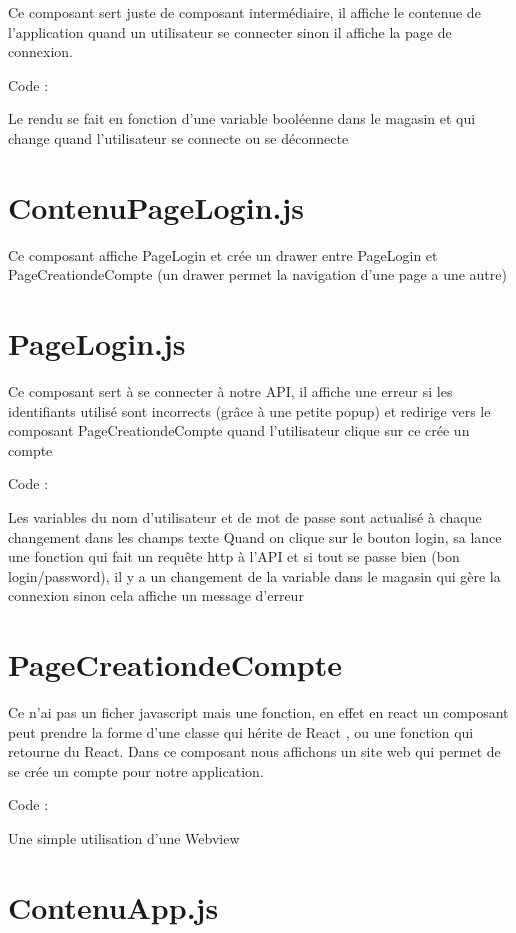 Ce composant sert juste de composant intermédiaire, il affiche le contenue de l’application quand un utilisateur se connecter sinon il affiche la page de connexion.

Code :

Le rendu se fait en fonction d’une variable booléenne dans le magasin et qui change quand l’utilisateur se connecte ou se déconnecte


\section{ContenuPageLogin.js}

Ce composant affiche PageLogin et crée un drawer entre PageLogin et PageCreationdeCompte (un drawer permet la navigation d’une page a une autre)

\section{PageLogin.js}

Ce composant sert à se connecter à notre API, il affiche une erreur si les identifiants utilisé sont incorrects (grâce à une petite popup) et redirige vers le composant PageCreationdeCompte quand l’utilisateur clique sur ce crée un compte

Code :

Les variables du nom d’utilisateur et de mot de passe sont actualisé à chaque changement dans les champs texte
Quand on clique sur le bouton login, sa lance une fonction qui fait un requête http à l’API et si tout se passe bien (bon login/password), il y a un changement de la variable dans le magasin qui gère la connexion sinon cela affiche un message d’erreur

\section{PageCreationdeCompte}

Ce n’ai pas un ficher javascript mais une fonction, en effet en react un composant peut prendre la forme d’une classe qui hérite de React , ou une fonction qui retourne du React. Dans ce composant nous affichons un site web qui permet de se crée un compte pour notre application.

Code :

Une simple utilisation d’une Webview

\section{ContenuApp.js}

